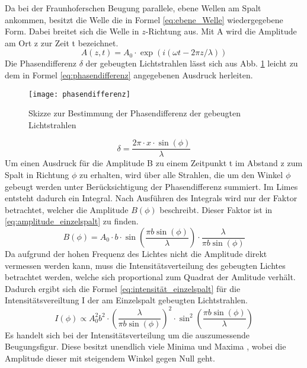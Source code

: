Da bei der Fraunhoferschen Beugung parallele, ebene Wellen am Spalt
ankommen, besitzt die Welle die in Formel \eqref{eq:ebene_Welle}
wiedergegebene Form. Dabei breitet sich die Welle in $z$-Richtung
aus. Mit A wird die Amplitude am Ort z zur Zeit t bezeichnet.
%
\begin{equation}
A(z,t) = A_0 \cdot \exp(i(\omega t - 2 \pi z / \lambda))
\label{eq:ebene_Welle}
\end{equation}
%
Die Phasendifferenz $\delta$ der gebeugten Lichtstrahlen lässt sich aus
Abb. \ref{fig:phasendifferenz} leicht zu dem in Formel
\eqref{eq:phasendifferenz} angegebenen Ausdruck herleiten.
%
\begin{figure}
  \centering
  \texttt{[image: phasendifferenz]}
  \caption{Skizze zur Bestimmung der Phasendifferenz der gebeugten
    Lichtstrahlen}
  \label{fig:phasendifferenz}
\end{figure}
%
\begin{equation}
\delta  = \frac{2 \pi \cdot x \cdot \sin(\phi)}{\lambda}
\label{eq:phasendifferenz}
\end{equation}
%
Um einen Ausdruck für die Amplitude B zu einem Zeitpunkt t im Abstand z
zum Spalt in Richtung $\phi$ zu erhalten, wird über alle Strahlen, die
um den Winkel $\phi$ gebeugt werden unter Berücksichtigung der
Phasendifferenz summiert. Im Limes entsteht dadurch ein Integral. Nach
Ausführen des Integrals wird nur der Faktor betrachtet, welcher die
Amplitude $B(\phi)$ beschreibt. Dieser Faktor ist in
\eqref{eq:amplitude_einzelspalt} zu finden.
%
\begin{equation}
  B(\phi) = A_0 \cdot b \cdot \sin\left(\frac{\pi b
      \sin(\phi)}{\lambda}\right) \cdot \frac{\lambda}{\pi b \sin(\phi)}
\label{eq:amplitude_einzelspalt}
\end{equation}
%
Da aufgrund der hohen Frequenz des Lichtes nicht die Amplitude direkt
vermessen werden kann, muss die Intensitätsverteilung des gebeugten
Lichtes betrachtet werden, welche sich proportional zum Quadrat der
Amlitude verhält. Dadurch ergibt sich die Formel
\eqref{eq:intensität_einzelspalt} für die Intensitätsvereiltung I der am
Einzelspalt gebeugten Lichtstrahlen.
%
\begin{equation}
  I(\phi) \propto A_{0}^2 b^2 \cdot \left(\frac{\lambda}{\pi b 
      \sin(\phi)}\right)^2 \cdot \sin^2\left(\frac{\pi b 
      \sin(\phi)}{\lambda}\right)
\label{eq:intensität_einzelspalt}
\end{equation}
%
Es handelt sich bei der Intensitätsverteilung um die auszumessende
Beugungsfigur. Diese besitzt unendlich viele Minima und Maxima , wobei
die Amplitude dieser mit steigendem Winkel gegen Null geht.
%
